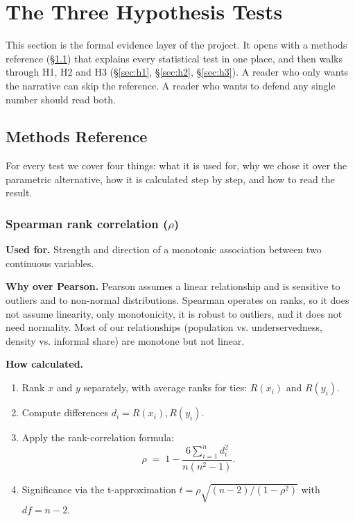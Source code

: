 
\section{The Three Hypothesis Tests}
\label{sec:phase2-hypotheses}

This section is the formal evidence layer of the project. It opens with
a methods reference (\S\ref{sec:hyp-methods}) that explains every
statistical test in one place, and then walks through H1, H2 and H3
(\S\ref{sec:h1}, \S\ref{sec:h2}, \S\ref{sec:h3}). A reader who only
wants the narrative can skip the reference. A reader who wants to
defend any single number should read both.

\subsection{Methods Reference}
\label{sec:hyp-methods}

For every test we cover four things: what it is used for, why we
chose it over the parametric alternative, how it is calculated step
by step, and how to read the result.

\subsubsection{Spearman rank correlation \texorpdfstring{($\rho$)}{}}

\textbf{Used for.} Strength and direction of a monotonic association
between two continuous variables.

\textbf{Why over Pearson.} Pearson assumes a linear relationship and
is sensitive to outliers and to non-normal distributions. Spearman
operates on ranks, so it does not assume linearity, only monotonicity,
it is robust to outliers, and it does not need normality. Most of our
relationships (population vs. underservedness, density vs. informal
share) are monotone but not linear.

\textbf{How calculated.}

\begin{enumerate}
 \item Rank $x$ and $y$ separately, with average ranks for ties:
 $R(x_i)$ and $R(y_i)$.
 \item Compute differences $d_i = R(x_i), R(y_i)$.
 \item Apply the rank-correlation formula:
 \begin{equation*}
 \rho \;=\; 1 - \dfrac{6 \sum_{i=1}^{n} d_i^2}{n(n^2 - 1)}.
 \end{equation*}
 \item Significance via the t-approximation
 $t = \rho \sqrt{(n-2)/(1-\rho^2)}$ with $df = n-2$.
\end{enumerate}

